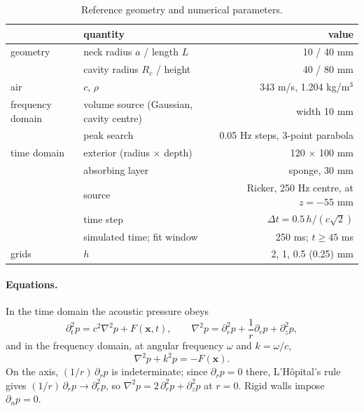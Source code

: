 \documentclass[11pt,a4paper]{article}
\begin{document}
\begin{table}[t]
\centering
\caption{Reference geometry and numerical parameters.}
\label{tab:params}
\small
\begin{tabular}{llr}
\toprule
 & quantity & value \\
\midrule
geometry & neck radius $a$ / length $L$ & 10 / 40 mm \\
 & cavity radius $R_c$ / height & 40 / 80 mm \\
air & $c$, $\rho$ & 343 m/s, 1.204 kg/m$^3$ \\
frequency domain & volume source (Gaussian, cavity centre) & width 10 mm \\
 & peak search & 0.05 Hz steps, 3-point parabola \\
time domain & exterior (radius $\times$ depth) & 120 $\times$ 100 mm \\
 & absorbing layer & sponge, 30 mm \\
 & source & Ricker, 250 Hz centre, at $z=-55$ mm \\
 & time step & $\Delta t = 0.5\,h/(c\sqrt2)$ \\
 & simulated time; fit window & 250 ms; $t \ge 45$ ms \\
grids & $h$ & 2, 1, 0.5 (0.25) mm \\
\bottomrule
\end{tabular}
\end{table}

\paragraph{Equations.} In the time domain the acoustic pressure obeys
\begin{equation}
  \partial_t^2 p = c^2 \nabla^2 p + F(\mathbf{x},t),
  \qquad
  \nabla^2 p = \partial_r^2 p + \frac{1}{r}\partial_r p + \partial_z^2 p ,
  \label{eq:wave}
\end{equation}
and in the frequency domain, at angular frequency $\omega$ and $k=\omega/c$,
\begin{equation}
  \nabla^2 p + k^2 p = -F(\mathbf{x}) .
  \label{eq:helmholtz}
\end{equation}
On the axis, $(1/r)\,\partial_r p$ is indeterminate; since $\partial_r p=0$ there,
L'H\^opital's rule gives $(1/r)\,\partial_r p \to \partial_r^2 p$, so
$\nabla^2 p = 2\,\partial_r^2 p + \partial_z^2 p$ at $r=0$. Rigid walls impose
$\partial_n p = 0$.
\end{document}
